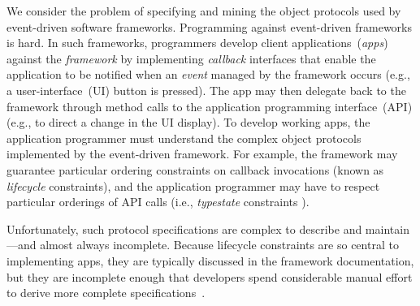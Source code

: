 \documentclass[10pt,reprint,nocopyrightspace,numbers]{sigplanconf}
\begin{document}
We consider the problem of specifying and mining the object protocols used by event-driven software frameworks.
Programming against event-driven frameworks is hard. 
In such frameworks, programmers develop client applications~(\emph{apps}) against the \emph{framework} by implementing \emph{callback} interfaces that enable the application to be notified when an \emph{event} managed by the framework occurs (e.g., a user-interface~(UI) button is pressed). The app may then delegate back to the framework through method calls to the application programming interface~(API) (e.g., to direct a change in the UI display).
To develop working apps, the application programmer must understand the complex object protocols implemented by the event-driven framework. For example, the framework may guarantee particular ordering constraints on callback invocations (known as \emph{lifecycle} constraints), and the application programmer may have to respect particular orderings of API calls (i.e., \emph{typestate} constraints%
).

Unfortunately, such protocol specifications are complex to describe and maintain---and almost always incomplete. Because lifecycle constraints are so central to implementing apps, they are typically discussed in the framework documentation,
but they are incomplete enough that developers spend considerable manual effort to derive more complete specifications~\cite{xxv-androidlifecycle}.

\end{document}
